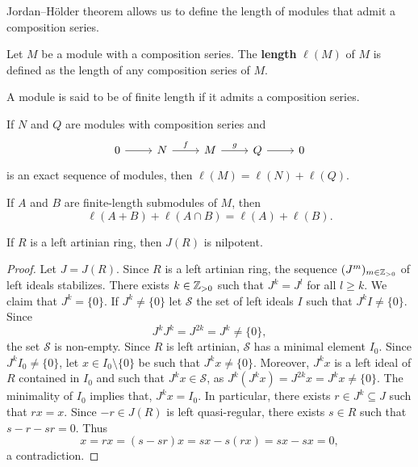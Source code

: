 Jordan--H\"older theorem allows us to define the 
length of modules that admit a composition series. 

\begin{definition}
    Let $M$ be a module with a composition series. 
    The \textbf{length} $\ell(M)$ of $M$ is defined as the length of any composition series of $M$. 
\end{definition}

A module is said to be of 
finite length if it admits a composition series. 

\begin{exercise}
	If $N$ and $Q$ are modules with composition series and  
	\[
	\begin{tikzcd}
		0 \arrow[r]
		& N \arrow{r}{f}
		& M \arrow{r}{g}
		& Q \arrow[r]
		& 0
	\end{tikzcd}
	\]
	is an exact sequence of modules, then $\ell(M)=\ell(N)+\ell(Q)$.
\end{exercise}


\begin{exercise}
	If $A$ and $B$ are finite-length submodules of $M$, then  
	\[
	\ell(A+B)+\ell(A\cap B)=\ell(A)+\ell(B).
	\]
\end{exercise}

\begin{theorem}
	\label{thm:Jnilpotente}
	If $R$ is a left artinian ring, then $J(R)$ is nilpotent. 
\end{theorem}

\begin{proof}
	Let $J=J(R)$. Since $R$ is a left artinian ring, the sequence 
	$(J^m)_{m\in\mathbb{Z}_{>0}}$ of left ideals stabilizes. There exists 
	$k\in\mathbb{Z}_{>0}$ such that $J^k=J^l$ for all $l\geq k$. We claim that $J^k=\{0\}$. If
	$J^k\ne\{0\}$ let $\mathcal{S}$ the set of left ideals 
	$I$ such that $J^kI\ne\{0\}$. Since 
	\[
	J^kJ^k=J^{2k}=J^k\ne\{0\},
	\]
	the set $\mathcal{S}$ is non-empty. 
	Since $R$ is left artinian, $\mathcal{S}$ has a minimal element $I_0$. Since $J^kI_0\ne\{0\}$, let $x\in
	I_0\setminus\{0\}$ be such that $J^kx\ne\{0\}$. Moreover, $J^kx$ is a left ideal of $R$ 
	contained in $I_0$ and such that $J^kx\in\mathcal{S}$, as 
	$J^k(J^kx)=J^{2k}x=J^kx\ne\{0\}$. The minimality of $I_0$ implies that, $J^kx=I_0$. In particular, 
	there exists $r\in J^k\subseteq J$ such that $rx=x$. Since $-r\in
	J(R)$ is left quasi-regular, there exists $s\in R$ such that $s-r-sr=0$.
	Thus 
	\[
		x=rx=(s-sr)x=sx-s(rx)=sx-sx=0,
	\]
	a contradiction.
\end{proof}

